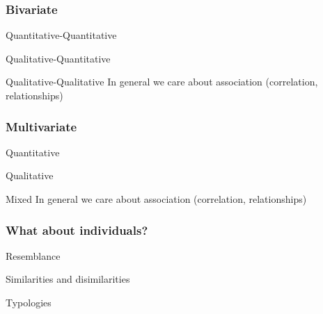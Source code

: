 \documentclass[12pt]{beamer}\usepackage[]{graphicx}\usepackage[]{color}
\begin{document}

\begin{frame}
\frametitle{Bivariate}

\bbi
  \item Quantitative-Quantitative
  \item Qualitative-Quantitative
  \item Qualitative-Qualitative
\ei
In general we care about association (correlation, relationships)

\end{frame}


\begin{frame}
\frametitle{Multivariate}

\bbi
  \item Quantitative
  \item Qualitative
  \item Mixed
\ei
In general we care about association (correlation, relationships)

\end{frame}


\begin{frame}
\frametitle{What about individuals?}

\bbi
  \item Resemblance
  \item Similarities and disimilarities
  \item Typologies
\ei

\end{frame}

\end{document}

